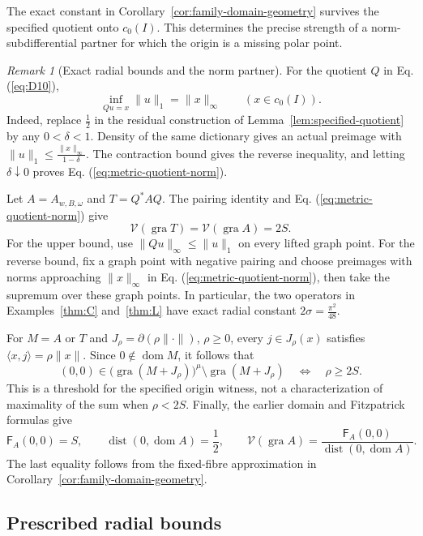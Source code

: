 \documentclass[11pt]{article}
\newcommand{\gra}{\operatorname{gra}}
\newcommand{\dom}{\operatorname{dom}}
\newcommand{\pair}[2]{\langle #1,#2\rangle}
\theoremstyle{definition}
\theoremstyle{remark}
\newtheorem{remark}{Remark}
\newcommand{\dist}{\operatorname{dist}}
\begin{document}
The exact constant in Corollary~\ref{cor:family-domain-geometry} survives the specified quotient onto $c_0(I)$. This determines the precise strength of a norm-subdifferential partner for which the origin is a missing polar point.

\begin{remark}[Exact radial bounds and the norm partner]
\label{rem:sharp-radial-transfer}
For the quotient $Q$ in Eq. (\ref{eq:D10}),
\begin{equation}
\inf_{Qu=x}\|u\|_1=\|x\|_\infty\qquad(x\in c_0(I)).
\label{eq:metric-quotient-norm}
\end{equation}
Indeed, replace $\frac12$ in the residual construction of Lemma~\ref{lem:specified-quotient} by any $0<\delta<1$. Density of the same dictionary gives an actual preimage with $\|u\|_1\le\frac{\|x\|_\infty}{1-\delta}$. The contraction bound gives the reverse inequality, and letting $\delta\downarrow0$ proves Eq. (\ref{eq:metric-quotient-norm}).

Let $A=A_{w,B,\omega}$ and $T=Q^*AQ$. The pairing identity and Eq. (\ref{eq:metric-quotient-norm}) give
\[
\mathcal V(\gra T)=\mathcal V(\gra A)=2S.
\]
For the upper bound, use $\|Qu\|_\infty\le\|u\|_1$ on every lifted graph point. For the reverse bound, fix a graph point with negative pairing and choose preimages with norms approaching $\|x\|_\infty$ in Eq. (\ref{eq:metric-quotient-norm}), then take the supremum over these graph points. In particular, the two operators in Examples~\ref{thm:C} and~\ref{thm:L} have exact radial constant $2\sigma=\frac{\pi^2}{48}$.

For $M=A$ or $T$ and $J_\rho=\partial(\rho\|\cdot\|)$, $\rho\ge0$, every $j\in J_\rho(x)$ satisfies $\pair{x}{j}=\rho\|x\|$. Since $0\notin\dom M$, it follows that
\[
(0,0)\in\bigl(\gra(M+J_\rho)\bigr)^\mu\setminus\gra(M+J_\rho)
\quad\Longleftrightarrow\quad \rho\ge2S.
\]
This is a threshold for the specified origin witness, not a characterization of maximality of the sum when $\rho<2S$. Finally, the earlier domain and Fitzpatrick formulas give
\[
\mathsf F_A(0,0)=S,\qquad
\dist(0,\dom A)=\frac12,\qquad
\mathcal V(\gra A)=\frac{\mathsf F_A(0,0)}{\dist(0,\dom A)}.
\]
The last equality follows from the fixed-fibre approximation in Corollary~\ref{cor:family-domain-geometry}.
\end{remark}


\subsection{Prescribed radial bounds}
\label{subsec:appendix-radial}
\end{document}

